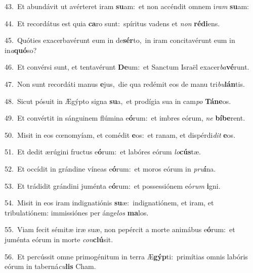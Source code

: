 {\numbfont\textcolor{\numbcolor}{43.}}~Et abundávit ut avérteret iram \textbf{su}\-am:~\star et non accéndit omnem i\textit{ram} \textbf{su}\-am:\par
{\numbfont\textcolor{\numbcolor}{44.}}~Et recordátus est quia \textbf{ca}\-ro sunt:~\star spíritus vadens et \textit{non} \textbf{réd}\-\textbf{i}ens.\par
{\numbfont\textcolor{\numbcolor}{45.}}~Quóties exacerbavérunt eum in de\-\textbf{sér}\-to,~\star in iram concitavérunt eum in in\-\textit{a}\-\textbf{quó}so?\par
{\numbfont\textcolor{\numbcolor}{46.}}~Et convérsi sunt, et tentavérunt \textbf{De}\-um:~\star et Sanctum Israël exacer\-\textit{ba}\-\textbf{vé}runt.\par
{\numbfont\textcolor{\numbcolor}{47.}}~Non sunt recordáti manus \textbf{e}\-jus,~\star die qua redémit eos de manu tri\-\textit{bu}\-\textbf{lán}tis.\par
{\numbfont\textcolor{\numbcolor}{48.}}~Sicut pósuit in Ægýpto signa \textbf{su}\-a,~\star et prodígia sua in cam\textit{po} \textbf{Tá}\-\textbf{ne}os.\par
{\numbfont\textcolor{\numbcolor}{49.}}~Et convértit in sánguinem flúmina e\-\textbf{ó}\-rum:~\star et imbres eórum, \textit{ne} \textbf{bí}\-\textbf{be}rent.\par
{\numbfont\textcolor{\numbcolor}{50.}}~Misit in eos cœnomyíam, et comédit \textbf{e}\-os:~\star et ranam, et dispérdi\textit{dit} \textbf{e}\-os.\par
{\numbfont\textcolor{\numbcolor}{51.}}~Et dedit ærúgini fructus e\-\textbf{ó}\-rum:~\star et labóres eórum \textit{lo}\-\textbf{cús}tæ.\par
{\numbfont\textcolor{\numbcolor}{52.}}~Et occídit in grándine víneas e\-\textbf{ó}\-rum:~\star et moros eórum in \textit{pru}\-\textbf{í}na.\par
{\numbfont\textcolor{\numbcolor}{53.}}~Et trádidit grándini juménta e\-\textbf{ó}\-rum:~\star et possessiónem eó\textit{rum} \textbf{i}\-gni.\par
{\numbfont\textcolor{\numbcolor}{54.}}~Misit in eos iram indignatiónis \textbf{su}\-æ:~\star indignatiónem, et iram, et tribulatiónem: immissiónes per ánge\textit{los} \textbf{ma}\-los.\par
{\numbfont\textcolor{\numbcolor}{55.}}~Viam fecit sémitæ iræ suæ, non pepércit a morte animábus e\-\textbf{ó}\-rum:~\star et juménta eórum in morte \textit{con}\-\textbf{clú}sit.\par
{\numbfont\textcolor{\numbcolor}{56.}}~Et percússit omne primogénitum in terra Æ\-\textbf{gýp}\-ti:~\star primítias omnis labóris eórum in taberná\-\textit{cu}\-\textbf{lis} Cham.\par
